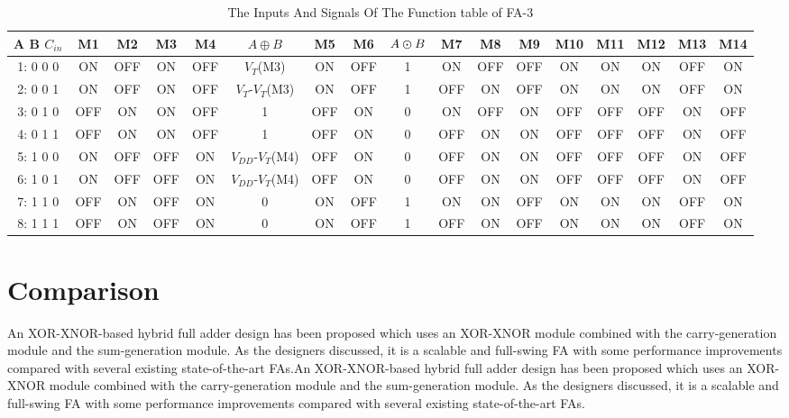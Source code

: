 \documentclass[conference]{IEEEtran}
\begin{document}
\begin{table}[!ht]
	\renewcommand{\arraystretch}{1.3}
	\caption{The Inputs And Signals Of The Function table of FA-3}
	\centering
	\begin{tabular}{ c *{16}{c}}
		\hline
		A B \(C_{in}\) & M1  & M2  & M3  & M4  & \(A \oplus B\)         & M5  & M6  & \(A \varodot B\) & M7  & M8  & M9  & M10 & M11 & M12 & M13 & M14 \\
		\hline
		1: 0 0 0       & ON  & OFF & ON  & OFF & \(V_{T}\)(M3)          & ON  & OFF & 1                & ON  & OFF & OFF & ON  & ON  & ON  & OFF & ON  \\
		2: 0 0 1       & ON  & OFF & ON  & OFF & \(V_{T}\)-\(V_T\)(M3)  & ON  & OFF & 1                & OFF & ON  & OFF & ON  & ON  & ON  & OFF & ON  \\
		3: 0 1 0       & OFF & ON  & ON  & OFF & 1                      & OFF & ON  & 0                & ON  & OFF & ON  & OFF & OFF & OFF & ON  & OFF \\
		4: 0 1 1       & OFF & ON  & ON  & OFF & 1                      & OFF & ON  & 0                & OFF & ON  & ON  & OFF & OFF & OFF & ON  & OFF \\
		5: 1 0 0       & ON  & OFF & OFF & ON  & \(V_{DD}\)-\(V_T\)(M4) & OFF & ON  & 0                & OFF & ON  & ON  & OFF & OFF & OFF & ON  & OFF \\
		6: 1 0 1       & ON  & OFF & OFF & ON  & \(V_{DD}\)-\(V_T\)(M4) & OFF & ON  & 0                & OFF & ON  & ON  & OFF & OFF & OFF & ON  & OFF \\
		7: 1 1 0       & OFF & ON  & OFF & ON  & 0                      & ON  & OFF & 1                & ON  & ON  & OFF & ON  & ON  & ON  & OFF & ON  \\
		8: 1 1 1       & OFF & ON  & OFF & ON  & 0                      & ON  & OFF & 1                & OFF & ON  & OFF & ON  & ON  & ON  & OFF & ON  \\
		\hline
	\end{tabular}
	\label{tb:fa3-func-pattern-in}
\end{table}

\section{Comparison}
\label{sec:5}

An XOR-XNOR-based hybrid full adder design has been proposed\cite{20212210429416}
which uses an XOR-XNOR module combined with the carry-generation module and the sum-generation module.
As the designers discussed, it is a scalable and full-swing FA
with some performance improvements compared with several existing state-of-the-art FAs.An XOR-XNOR-based hybrid full adder design has been proposed\cite{20212210429416}
which uses an XOR-XNOR module combined with the carry-generation module and the sum-generation module.
As the designers discussed, it is a scalable and full-swing FA
with some performance improvements compared with several existing state-of-the-art FAs.
\end{document}

